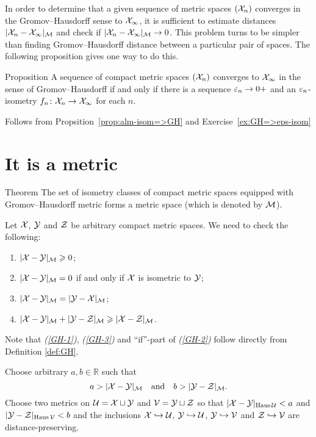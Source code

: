 In order to determine that a given sequence of metric spaces $(\mathcal{X}_n)$ converges in the Gromov--Hausdorff sense to $\mathcal{X}_\infty$, it is sufficient to estimate distances $|\mathcal{X}_n-\mathcal{X}_\infty|_{\mathcal{M}}$ and  check if $|\mathcal{X}_n-\mathcal{X}_\infty|_{\mathcal{M}}\to 0$.
This problem turns to be simpler than finding Gromov--Hausdorff distance between a particular pair of spaces.
The following proposition gives one way to do this.

\begin{thm}{Proposition}\label{prop:GH-e-isom}
A sequence of compact metric spaces $(\mathcal{X}_n)$ converges to  $\mathcal{X}_\infty$ in the sense of Gromov--Hausdorff if and only if there is a sequence $\varepsilon_n\to0+$
and an $\varepsilon_n$-isometry $f_n\colon\mathcal{X}_n\to \mathcal{X}_\infty$ for each $n$.
\end{thm}

 Follows from Propsition~\ref{prop:alm-isom=>GH} and Exercise~\ref{ex:GH=>eps-isom}
\qeds

\section{It is a metric}

\begin{thm}{Theorem}\label{thm:GH-is-a-metric}
The set of isometry classes of compact metric spaces equipped with Gromov--Hausdorff metric forms a metric space (which is denoted by $\mathcal{M}$).
\end{thm}

Let $\mathcal{X}$, $\mathcal{Y}$ and $\mathcal{Z}$ be arbitrary  compact metric spaces.
We need to check the following:
\begin{enumerate}[{\it (i)}]
\item\label{GH-1} $|\mathcal{X}-\mathcal{Y}|_{\mathcal{M}}\geqslant 0$;
\item\label{GH-2} $|\mathcal{X}-\mathcal{Y}|_{\mathcal{M}}=0$ if and only if $\mathcal{X}$ is isometric to $\mathcal{Y}$;
\item\label{GH-3} $|\mathcal{X}-\mathcal{Y}|_{\mathcal{M}}=|\mathcal{Y}-\mathcal{X}|_{\mathcal{M}}$;
\item\label{GH-4} $|\mathcal{X}-\mathcal{Y}|_{\mathcal{M}}+|\mathcal{Y}-\mathcal{Z}|_{\mathcal{M}}\geqslant |\mathcal{X}-\mathcal{Z}|_{\mathcal{M}}$.
\end{enumerate}


Note that {\it (\ref{GH-1})}, {\it(\ref{GH-3})} and ``if''-part of {\it(\ref{GH-2})} follow directly from Definition \ref{def:GH}.

Choose arbitrary $a,b \in \mathbb{R}$ such that
$$a>|\mathcal{X}-\mathcal{Y}|_{\mathcal{M}}
\quad\text{and}\quad
b>|\mathcal{Y}-\mathcal{Z}|_{\mathcal{M}}.$$
Choose two metrics on $\mathcal{U}=\mathcal{X}\sqcup \mathcal{Y}$ and $\mathcal{V}=\mathcal{Y}\sqcup \mathcal{Z}$ so that
$|\mathcal{X}-\mathcal{Y}|_{\operatorname{\rm Haus}\nolimits\mathcal{U}}<a$ and $|\mathcal{Y}-\mathcal{Z}|_{\operatorname{\rm Haus}\nolimits\mathcal{V}}<b$ 
and the inclusions $\mathcal{X}\hookrightarrow \mathcal{U}$, $\mathcal{Y}\hookrightarrow \mathcal{U}$, $\mathcal{Y}\hookrightarrow \mathcal{V}$ and $\mathcal{Z}\hookrightarrow \mathcal{V}$ are distance-preserving.

